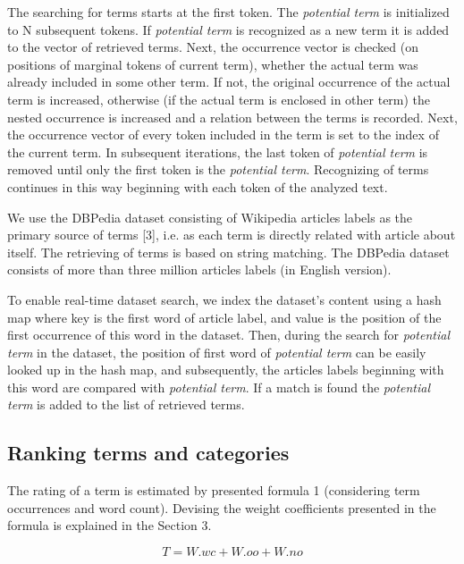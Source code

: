 \documentclass{llncs}
\begin{document}
The searching for terms starts at the first token. The \textit{potential term} is initialized to N subsequent tokens. If \textit{potential term} is recognized as a new term it is added to the vector of retrieved terms. Next, the occurrence vector is checked (on positions of marginal tokens of current term), whether the actual term was already included in some other term. If not, the original occurrence of the actual term is increased, otherwise (if the actual term is enclosed in other term) the nested occurrence is increased and a relation between the terms is recorded. Next, the occurrence vector of every token included in the term is set to the index of the current term. In subsequent iterations, the last token of \textit{potential term} is removed until only the first token is the \textit{potential term}. Recognizing of terms continues in this way beginning with each token of the analyzed text.

We use the DBPedia dataset consisting of Wikipedia articles labels as the primary source of terms [3], i.e. as each term is directly related with article about itself. The retrieving of terms is based on string matching. The DBPedia dataset consists of more than three million articles labels (in English version).  

To enable real-time dataset search, we index the dataset’s content using a hash map where key is the first word of article label, and value is the position of the first occurrence of this word in the dataset. Then, during the search for \textit{potential term} in the dataset, the position of first word of \textit{potential term} can be easily looked up in the hash map, and subsequently, the articles labels beginning with this word are compared with \textit{potential term}. If a match is found the \textit{potential term} is added to the list of retrieved terms. 



\subsection{Ranking terms and categories}

The rating of a term is estimated by presented formula 1 (considering term occurrences and word count). Devising the weight coefficients presented in the formula is explained in the Section 3. 

\begin{equation}
T =	W	.	wc	+	W	.	oo	+	W	.	no
\end{equation}
\end{document}
